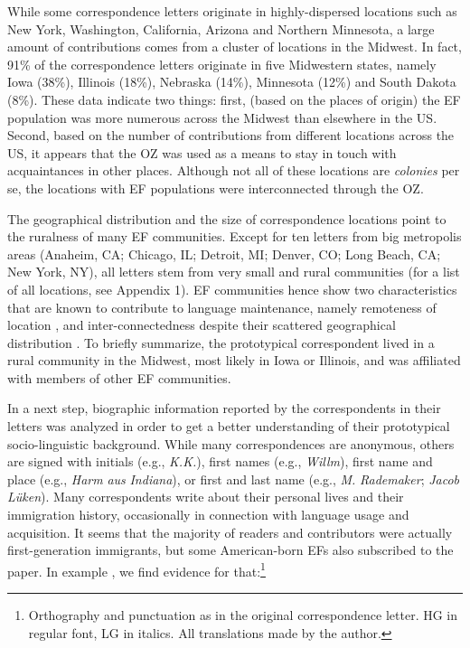 \documentclass[output=paper]{langsci/langscibook}
\begin{document}
While some correspondence letters originate in highly-dispersed locations such as New York, Washington, California, Arizona and Northern Minnesota, a large amount of contributions comes from a cluster of locations in the Midwest. In fact, 91\% of the correspondence letters originate in five Midwestern states, namely Iowa (38\%), Illinois (18\%), Nebraska (14\%), Minnesota (12\%) and South Dakota (8\%). These data indicate two things: first, (based on the places of origin) the EF population was more numerous across the Midwest than elsewhere in the US. Second, based on the number of contributions from different locations across the US, it appears that the OZ was used as a means to stay in touch with acquaintances in other places. Although not all of these locations are \textit{colonies} per se, the locations with EF populations were interconnected through the OZ.

The geographical distribution and the size of correspondence locations point to the ruralness of many EF communities. Except for ten letters from big metropolis areas (Anaheim, CA; Chicago, IL; Detroit, MI; Denver, CO; Long Beach, CA; New York, NY), all letters stem from very small and rural communities (for a list of all locations, see Appendix 1). EF communities hence show two characteristics that are known to contribute to language maintenance, namely remoteness of location \citep{Louden2006}, and inter-connectedness despite their scattered geographical distribution \citep{Reschly2000}. To briefly summarize, the prototypical correspondent lived in a rural community in the Midwest, most likely in Iowa or Illinois, and was affiliated with members of other EF communities. 

In a next step, biographic information reported by the correspondents in their letters was analyzed in order to get a better understanding of their prototypical socio-linguistic background. While many correspondences are anonymous, others are signed with initials (e.g., \textit{K.K.}), first names (e.g., \textit{Willm}), first name and place (e.g., \textit{Harm} \textit{aus} \textit{Indiana}), or first and last name (e.g., \textit{M.} \textit{Rademaker}; \textit{Jacob} \textit{Lüken}). Many correspondents write about their personal lives and their immigration history, occasionally in connection with language usage and acquisition. It seems that the majority of readers and contributors were actually first-generation immigrants, but some American-born EFs also subscribed to the paper. In example , we find evidence for that:\footnote{Orthography and punctuation as in the original correspondence letter. HG in regular font, LG in italics. All translations made by the author.}
\end{document}

